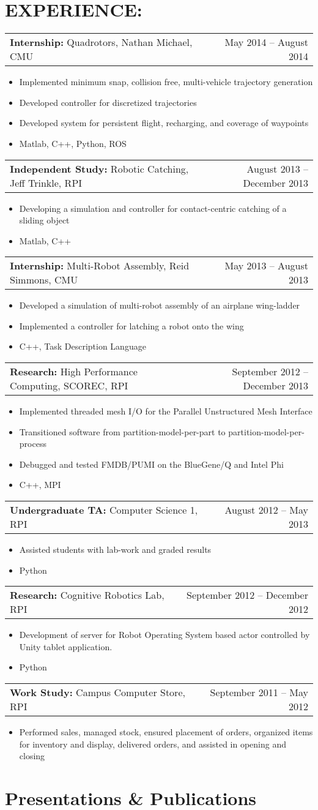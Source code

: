 \documentclass[margin]{res}
\newcommand{\experience}[4]{
	\begin{tabular}{p{4in} r}
    {\bf #1} #2 & #3
  \end{tabular}
  \begin{itemize}
      #4
  \end{itemize}
}
\begin{document}
\begin{resume}
 \section{EXPERIENCE:}      
  \experience{Internship:}{Quadrotors, Nathan Michael, CMU}
    {May 2014 -- August 2014}
  {
    \item Implemented minimum snap, collision free, multi-vehicle trajectory
      generation
    \item Developed controller for discretized trajectories
    \item Developed system for persistent flight, recharging, and coverage of waypoints
    \item Matlab, C++, Python, ROS
  }
  \experience{Independent Study:}{Robotic Catching, Jeff Trinkle, RPI}{ August
  2013 -- December 2013}
  {
    \item Developing a simulation and controller for contact-centric catching of a sliding object
    \item Matlab, C++
  }
  \experience{Internship: }{Multi-Robot Assembly, Reid Simmons, CMU}{May 2013 -- August 2013}
  {
    \item Developed a simulation of multi-robot assembly of an airplane wing-ladder
    \item Implemented a controller for latching a robot onto the wing 
    \item C++, Task Description Language
  }
  \experience{Research: }{High Performance Computing, SCOREC, RPI}{September 2012 -- December 2013}
  {
		\item Implemented threaded mesh I/O for the Parallel Unstructured Mesh Interface
    \item Transitioned software from partition-model-per-part to partition-model-per-process
		\item Debugged and tested FMDB/PUMI on the BlueGene/Q and Intel Phi
    \item C++, MPI
  }
  \experience{Undergraduate TA: }{Computer Science 1, RPI}{August 2012 -- May 2013}
  {
		\item Assisted students with lab-work and graded results
    \item Python
  }
  \experience{Research: }{Cognitive Robotics Lab, RPI}{September 2012 -- December 2012}
  {
		\item Development of server for Robot Operating System based actor
			controlled by Unity tablet application.
    \item Python
  }
  \experience{Work Study:}{Campus Computer Store, RPI}{September 2011 -- May 2012}
  {
   	\item Performed sales, managed stock, ensured placement of orders, organized items for
					inventory and display, delivered orders, and assisted in opening and closing
  }
\normalsize{\section{Presentations \& Publications}}
\nocite{persistentpaper}
\nocite{persistentposter}
\nocite{boeingposter}
\nocite{boeingpaper}
\renewcommand\refname{}




\end{resume}
\end{document}
